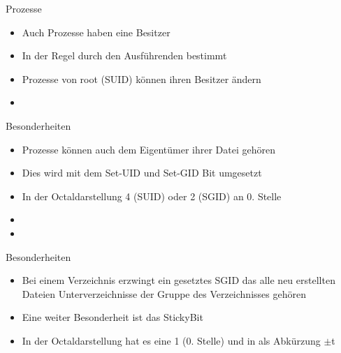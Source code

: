 \documentclass[aspectratio=43]{beamer}
\begin{document}
\begin{frame} 
	\begin{block}{Prozesse}
	\begin{itemize}
	\item Auch Prozesse haben eine Besitzer
	\item In der Regel durch den Ausführenden bestimmt
	\item Prozesse von root (SUID) können ihren Besitzer ändern
	\end{itemize}
	\end{block}
	\begin{exampleblock}{}
	\begin{itemize}
	\item {}
	\end{itemize}
	\end{exampleblock}
\end{frame}

\begin{frame} 

	\begin{block}{Besonderheiten}
	\begin{itemize}
	\item Prozesse können auch dem Eigentümer ihrer Datei gehören
	\item Dies wird mit dem Set-UID und Set-GID Bit umgesetzt
	\item In der Octaldarstellung 4 (SUID) oder 2 (SGID) an 0. Stelle
	\end{itemize}
	\end{block}
	\begin{exampleblock}{}
	\begin{itemize}
	\item {}
	\item {}
	\end{itemize}
	\end{exampleblock}
\end{frame}


\begin{frame} 
	\begin{block}{Besonderheiten}
	\begin{itemize}
	\item Bei einem Verzeichnis erzwingt ein gesetztes SGID das alle neu erstellten Dateien Unterverzeichnisse  der Gruppe des Verzeichnisses gehören
	\item Eine weiter Besonderheit ist das StickyBit
	\item In der Octaldarstellung hat es eine 1 (0. Stelle) und in als Abkürzung  $\pm$t
	\end{itemize}
	\end{block}
\end{frame}
\end{document}
